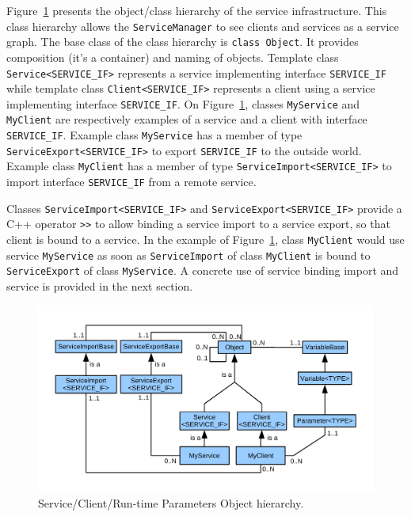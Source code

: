 Figure~\ref{fig:tms320c3x_object_hierarchy} presents the object/class hierarchy of the service infrastructure.
This class hierarchy allows the \texttt{ServiceManager} to see clients and services as a service graph. 
The base class of the class hierarchy is \texttt{class Object}. 
It provides composition (it's a container) and naming of objects.
Template class \texttt{Service<SERVICE\_IF>} represents a service implementing interface \texttt{SERVICE\_IF} while template class \texttt{Client<SERVICE\_IF>} represents a client using a service implementing interface \texttt{SERVICE\_IF}.
On Figure~\ref{fig:tms320c3x_object_hierarchy}, classes \texttt{MyService} and \texttt{MyClient} are respectively examples of a service and a client with interface \texttt{SERVICE\_IF}.
Example class \texttt{MyService} has a member of type \texttt{ServiceExport<SERVICE\_IF>} to export \texttt{SERVICE\_IF} to the outside world.
Example class \texttt{MyClient} has a member of type \texttt{ServiceImport<SERVICE\_IF>} to import interface \texttt{SERVICE\_IF} from a remote service.

Classes \texttt{ServiceImport<SERVICE\_IF>} and \texttt{ServiceExport<SERVICE\_IF>} provide a C++ operator \texttt{>>} to allow binding a service import to a service export, so that client is bound to a service.
In the example of Figure~\ref{fig:tms320c3x_object_hierarchy}, class \texttt{MyClient} would use service \texttt{MyService} as soon as \texttt{ServiceImport} of class \texttt{MyClient} is bound to \texttt{ServiceExport} of class \texttt{MyService}.
A concrete use of service binding import and service is provided in the next section.

\begin{figure}[!h]
	\begin{center}
		\includegraphics[width=\textwidth]{tms320c3x/fig_object_hierarchy.pdf}
	\end{center}
	\caption{Service/Client/Run-time Parameters Object hierarchy.}
	\label{fig:tms320c3x_object_hierarchy}
\end{figure}

